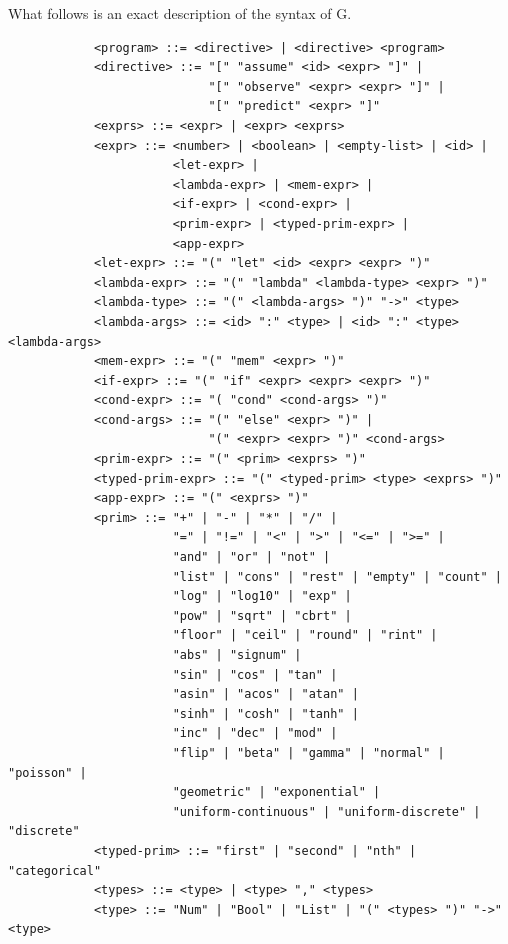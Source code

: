 \documentclass[a4paper]{article}
\begin{document}
What follows is an exact description of the syntax of G.
\begin{center}
	\begin{varwidth}{\linewidth}
		\small
		\begin{verbatim}
			<program> ::= <directive> | <directive> <program>
			<directive> ::= "[" "assume" <id> <expr> "]" |
			                "[" "observe" <expr> <expr> "]" |
			                "[" "predict" <expr> "]"
			<exprs> ::= <expr> | <expr> <exprs>
			<expr> ::= <number> | <boolean> | <empty-list> | <id> |
			           <let-expr> |
			           <lambda-expr> | <mem-expr> |
			           <if-expr> | <cond-expr> |
			           <prim-expr> | <typed-prim-expr> |
			           <app-expr>
			<let-expr> ::= "(" "let" <id> <expr> <expr> ")"
			<lambda-expr> ::= "(" "lambda" <lambda-type> <expr> ")"
			<lambda-type> ::= "(" <lambda-args> ")" "->" <type>
			<lambda-args> ::= <id> ":" <type> | <id> ":" <type> <lambda-args>
			<mem-expr> ::= "(" "mem" <expr> ")"
			<if-expr> ::= "(" "if" <expr> <expr> <expr> ")"
			<cond-expr> ::= "( "cond" <cond-args> ")"
			<cond-args> ::= "(" "else" <expr> ")" |
			                "(" <expr> <expr> ")" <cond-args>
			<prim-expr> ::= "(" <prim> <exprs> ")"
			<typed-prim-expr> ::= "(" <typed-prim> <type> <exprs> ")"
			<app-expr> ::= "(" <exprs> ")"
			<prim> ::= "+" | "-" | "*" | "/" |
			           "=" | "!=" | "<" | ">" | "<=" | ">=" |
			           "and" | "or" | "not" |
			           "list" | "cons" | "rest" | "empty" | "count" |
			           "log" | "log10" | "exp" |
			           "pow" | "sqrt" | "cbrt" |
			           "floor" | "ceil" | "round" | "rint" |
			           "abs" | "signum" |
			           "sin" | "cos" | "tan" |
			           "asin" | "acos" | "atan" |
			           "sinh" | "cosh" | "tanh" |
			           "inc" | "dec" | "mod" |
			           "flip" | "beta" | "gamma" | "normal" | "poisson" |
			           "geometric" | "exponential" |
			           "uniform-continuous" | "uniform-discrete" | "discrete"
			<typed-prim> ::= "first" | "second" | "nth" | "categorical"
			<types> ::= <type> | <type> "," <types>
			<type> ::= "Num" | "Bool" | "List" | "(" <types> ")" "->" <type>
		\end{verbatim}
	\end{varwidth}
\end{center}



\end{document}
